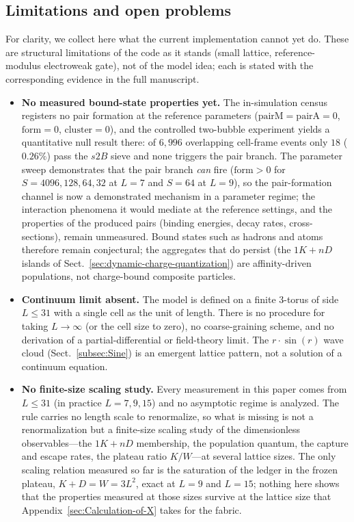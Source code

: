 \documentclass[a4paper]{article}
\begin{document}
\subsection{Limitations and open problems}
For clarity, we collect here what the current implementation cannot yet do.  These are structural limitations of the code as it stands (small lattice, reference-modulus electroweak gate), not of the model idea; each is stated with the corresponding evidence in the full manuscript.
\begin{itemize}
\item \textbf{No measured bound-state properties yet.}  The in-simulation census registers no pair formation at the reference parameters ($\mathrm{pairM}=\mathrm{pairA}=0$, $\mathrm{form}=0$, $\mathrm{cluster}=0$), and the controlled two-bubble experiment yields a quantitative null result there: of $6{,}996$ overlapping cell-frame events only $18$ ($0.26\%$) pass the $s2B$ sieve and none triggers the pair branch.  The parameter sweep demonstrates that the pair branch \emph{can} fire ($\mathrm{form}>0$ for $S=4096,128,64,32$ at $L=7$ and $S=64$ at $L=9$), so the pair-formation channel is now a demonstrated mechanism in a parameter regime; the interaction phenomena it would mediate at the reference settings, and the properties of the produced pairs (binding energies, decay rates, cross-sections), remain unmeasured.  Bound states such as hadrons and atoms therefore remain conjectural; the aggregates that do persist (the $1K+nD$ islands of Sect.~\ref{sec:dynamic-charge-quantization}) are affinity-driven populations, not charge-bound composite particles.
\item \textbf{Continuum limit absent.}  The model is defined on a finite $3$-torus of side $L\le31$ with a single cell as the unit of length.  There is no procedure for taking $L\to\infty$ (or the cell size to zero), no coarse-graining scheme, and no derivation of a partial-differential or field-theory limit.  The $r\cdot\sin(r)$ wave cloud (Sect.~\ref{subsec:Sine}) is an emergent lattice pattern, not a solution of a continuum equation.
\item \textbf{No finite-size scaling study.}  Every measurement in this paper comes from $L\le31$ (in practice $L=7,9,15$) and no asymptotic regime is analyzed.  The rule carries no length scale to renormalize, so what is missing is not a renormalization but a finite-size scaling study of the dimensionless observables---the $1K+nD$ membership, the population quantum, the capture and escape rates, the plateau ratio $K/W$---at several lattice sizes.  The only scaling relation measured so far is the saturation of the ledger in the frozen plateau, $K+D=W=3L^{2}$, exact at $L=9$ and $L=15$; nothing here shows that the properties measured at those sizes survive at the lattice size that Appendix~\ref{sec:Calculation-of-X} takes for the fabric.

\end{itemize}
\end{document}
